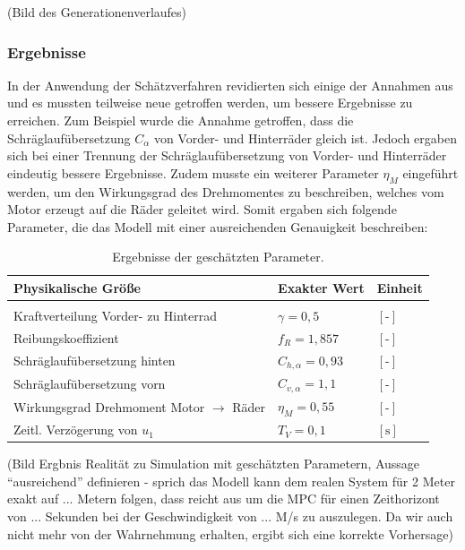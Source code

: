 (Bild des Generationenverlaufes)  

\subsubsection{Ergebnisse}
In der Anwendung der Schätzverfahren revidierten sich einige der Annahmen aus \cite{VikAnd} und es mussten teilweise neue getroffen werden, um bessere Ergebnisse zu erreichen. Zum Beispiel wurde die Annahme getroffen, dass die Schräglaufübersetzung $C_{\alpha}$ von Vorder- und Hinterräder gleich ist. Jedoch ergaben sich bei einer Trennung der Schräglaufübersetzung von Vorder- und Hinterräder eindeutig bessere Ergebnisse. Zudem musste ein weiterer Parameter $\eta_M$ eingeführt werden, um den Wirkungsgrad des Drehmomentes zu beschreiben, welches vom Motor erzeugt auf die Räder geleitet wird. Somit ergaben sich folgende Parameter, die das Modell mit einer ausreichenden Genauigkeit beschreiben: 

\begin{table}[h!]
\centering
\begin{tabularx}{\columnwidth}{m{7cm}|m{4cm}|X}
  \textbf{Physikalische Größe} & \textbf{Exakter Wert}& \textbf{Einheit}\\\hline\hline 
	\rule{0pt}{1mm} & &\\
	Kraftverteilung Vorder- zu Hinterrad& $\gamma=0,5$ & $[\text{-}]$\\
	Reibungskoeffizient& $f_R=1,857$ & $[\text{-}]$\\
	Schräglaufübersetzung hinten& $C_{h,\alpha}=0,93$ & $[\text{-}]$\\
  	Schräglaufübersetzung vorn& $C_{v,\alpha}=1,1$ & $[\text{-}]$\\
  	Wirkungsgrad Drehmoment Motor $\rightarrow$ Räder& $\eta_M=0,55$ & $[\text{-}]$\\
	Zeitl. Verzögerung von $u_{1}$& $T_{V}=0,1$ & $[\text{s}]$
\end{tabularx}
\caption{Ergebnisse der geschätzten Parameter. \label{tab:ParSch}}
\end{table} 

(Bild Ergbnis Realität zu Simulation mit geschätzten Parametern, Aussage "`ausreichend"' definieren - sprich das Modell kann dem realen System für 2 Meter exakt auf ... Metern folgen, dass reicht aus um die MPC für einen Zeithorizont von ... Sekunden bei der Geschwindigkeit von ... M/s zu auszulegen. Da wir auch nicht mehr von der Wahrnehmung erhalten, ergibt sich eine korrekte Vorhersage)
